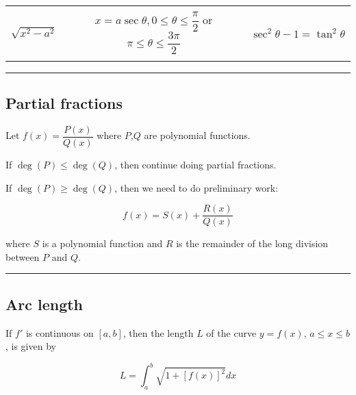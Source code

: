 \documentclass[
  landscape,  
  10pt,
]{article}
\begin{document}
\begin{longtable}[]{@{}ccc@{}}
\begin{minipage}[t]{0.30\columnwidth}
\strut
\end{minipage}\tabularnewline
\begin{minipage}[t]{0.30\columnwidth}\centering
\(\sqrt{x^2-a^2}\)\strut
\end{minipage} & \begin{minipage}[t]{0.30\columnwidth}\centering
\(x = a \sec \theta, 0 \leq \theta \leq \dfrac{\pi}{2}\) or
\(\pi \leq \theta \leq \dfrac{3\pi}{2}\)\strut
\end{minipage} & \begin{minipage}[t]{0.30\columnwidth}\centering
\(\sec^2 \theta - 1 = \tan^2 \theta\)\strut
\end{minipage}\tabularnewline
\begin{minipage}[t]{0.30\columnwidth}\centering
\strut
\end{minipage} & \begin{minipage}[t]{0.30\columnwidth}\centering
\strut
\end{minipage} & \begin{minipage}[t]{0.30\columnwidth}\centering
\strut
\end{minipage}\tabularnewline
\bottomrule
\end{longtable}

\begin{center}\rule{0.5\linewidth}{0.5pt}\end{center}

\begin{multicols}{3}

\hypertarget{partial-fractions}{%
\subsection{Partial fractions}\label{partial-fractions}}

Let \(f(x) = \dfrac{P(x)}{Q(x)}\) where \(P\),\(Q\) are polynomial
functions.

If \(\deg(P) \leq \deg(Q)\), then continue doing partial fractions.

If \(\deg(P) \geq \deg(Q)\), then we need to do preliminary work:

\[ f(x) = S(x) + \frac{R(x)}{Q(x)} \]

where \(S\) is a polynomial function and \(R\) is the remainder of the
long division between \(P\) and \(Q\).

\begin{center}\rule{0.5\linewidth}{0.5pt}\end{center}

\hypertarget{arc-length}{%
\subsection{Arc length}\label{arc-length}}

If \(f'\) is continuous on \([a,b]\), then the length \(L\) of the curve
\(y = f(x)\), \(a \leq x \leq b\), is given by

\[ L = \int_a^b \sqrt{1+[f(x)]^2}dx \]

\end{multicols}
\end{document}
